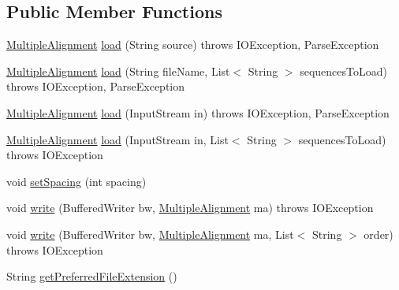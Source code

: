 \subsection*{Public Member Functions}
\begin{DoxyCompactItemize}
\item 
\hyperlink{classbroad_1_1core_1_1multiplealignment_1_1_multiple_alignment}{Multiple\+Alignment} \hyperlink{classbroad_1_1core_1_1multiplealignment_1_1_phylip_interleaved_multiple_alignment_i_o_a6c8e7f0c1cba4b0e65a579bc0c22d5c6}{load} (String source)  throws I\+O\+Exception, Parse\+Exception 
\item 
\hyperlink{classbroad_1_1core_1_1multiplealignment_1_1_multiple_alignment}{Multiple\+Alignment} \hyperlink{classbroad_1_1core_1_1multiplealignment_1_1_phylip_interleaved_multiple_alignment_i_o_a918d6c6541540a5b8bf64f8a237b900b}{load} (String file\+Name, List$<$ String $>$ sequences\+To\+Load)  throws I\+O\+Exception, Parse\+Exception 
\item 
\hyperlink{classbroad_1_1core_1_1multiplealignment_1_1_multiple_alignment}{Multiple\+Alignment} \hyperlink{classbroad_1_1core_1_1multiplealignment_1_1_phylip_interleaved_multiple_alignment_i_o_a1bb836d63a97f0d4533f6e4de26406e1}{load} (Input\+Stream in)  throws I\+O\+Exception, Parse\+Exception 
\item 
\hyperlink{classbroad_1_1core_1_1multiplealignment_1_1_multiple_alignment}{Multiple\+Alignment} \hyperlink{classbroad_1_1core_1_1multiplealignment_1_1_phylip_interleaved_multiple_alignment_i_o_ab5f8017a0ead2700a3d7a287b18babdd}{load} (Input\+Stream in, List$<$ String $>$ sequences\+To\+Load)  throws I\+O\+Exception 
\item 
void \hyperlink{classbroad_1_1core_1_1multiplealignment_1_1_phylip_interleaved_multiple_alignment_i_o_a6fcac155d471e8d2a0ddbf0e8ffcebd8}{set\+Spacing} (int spacing)
\item 
void \hyperlink{classbroad_1_1core_1_1multiplealignment_1_1_phylip_interleaved_multiple_alignment_i_o_a7a755364aa39d937f9fbaceec6d2fd15}{write} (Buffered\+Writer bw, \hyperlink{classbroad_1_1core_1_1multiplealignment_1_1_multiple_alignment}{Multiple\+Alignment} ma)  throws I\+O\+Exception 
\item 
void \hyperlink{classbroad_1_1core_1_1multiplealignment_1_1_phylip_interleaved_multiple_alignment_i_o_a3cef7c3cf8c814816a0d4c0855323f36}{write} (Buffered\+Writer bw, \hyperlink{classbroad_1_1core_1_1multiplealignment_1_1_multiple_alignment}{Multiple\+Alignment} ma, List$<$ String $>$ order)  throws I\+O\+Exception 
\item 
String \hyperlink{classbroad_1_1core_1_1multiplealignment_1_1_phylip_interleaved_multiple_alignment_i_o_a5f071bdcdad8ea9a4dcafbbd8ebc9b2a}{get\+Preferred\+File\+Extension} ()
\end{DoxyCompactItemize}


